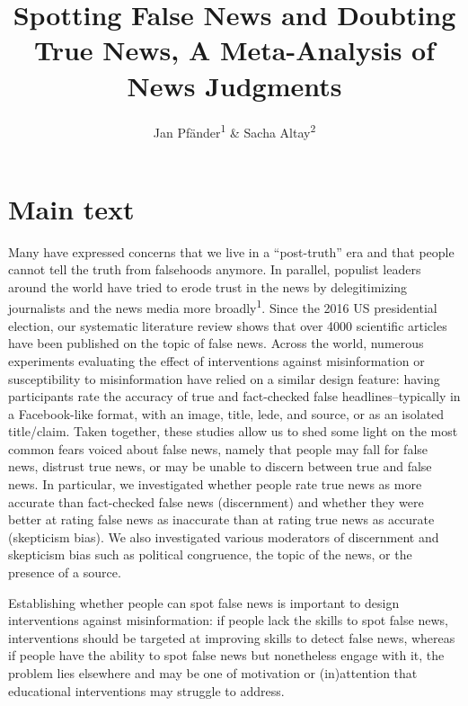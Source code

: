 \documentclass[
  man]{apa6}
\title{Spotting False News and Doubting True News, A Meta-Analysis of News Judgments}
\author{Jan Pfänder\textsuperscript{1} \& Sacha Altay\textsuperscript{2}}
\date{}
\affiliation{\vspace{0.5cm}\textsuperscript{1} Institut Jean Nicod, Département d'études cognitives, ENS, EHESS, PSL University, CNRS, France\\\textsuperscript{2} Department of Political Science, University of Zurich, Switzerland}
\begin{document}
\maketitle

\clearpage

\section{Main text}\label{main-text}

Many have expressed concerns that we live in a ``post-truth'' era and that people cannot tell the truth from falsehoods anymore. In parallel, populist leaders around the world have tried to erode trust in the news by delegitimizing journalists and the news media more broadly\textsuperscript{1}. Since the 2016 US presidential election, our systematic literature review shows that over 4000 scientific articles have been published on the topic of false news. Across the world, numerous experiments evaluating the effect of interventions against misinformation or susceptibility to misinformation have relied on a similar design feature: having participants rate the accuracy of true and fact-checked false headlines--typically in a Facebook-like format, with an image, title, lede, and source, or as an isolated title/claim. Taken together, these studies allow us to shed some light on the most common fears voiced about false news, namely that people may fall for false news, distrust true news, or may be unable to discern between true and false news. In particular, we investigated whether people rate true news as more accurate than fact-checked false news (discernment) and whether they were better at rating false news as inaccurate than at rating true news as accurate (skepticism bias). We also investigated various moderators of discernment and skepticism bias such as political congruence, the topic of the news, or the presence of a source.

Establishing whether people can spot false news is important to design interventions against misinformation: if people lack the skills to spot false news, interventions should be targeted at improving skills to detect false news, whereas if people have the ability to spot false news but nonetheless engage with it, the problem lies elsewhere and may be one of motivation or (in)attention that educational interventions may struggle to address.
\end{document}
